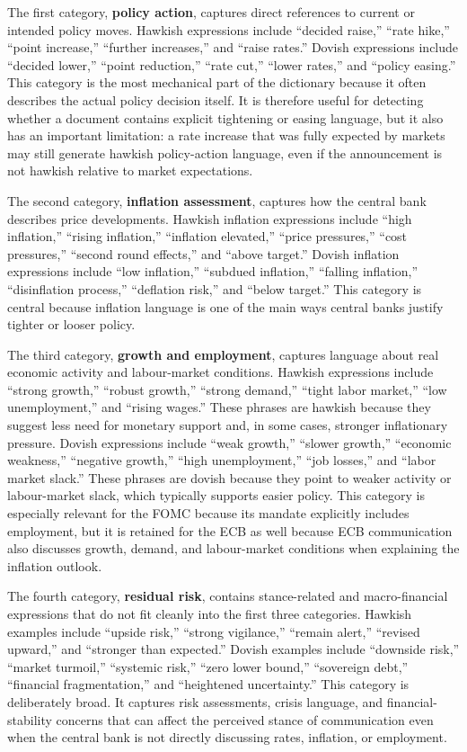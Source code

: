 The first category, \textbf{policy action}, captures direct
references to current or intended policy moves. Hawkish expressions
include ``decided raise,'' ``rate hike,'' ``point increase,''
``further increases,'' and ``raise rates.'' Dovish expressions
include ``decided lower,'' ``point reduction,'' ``rate cut,''
``lower rates,'' and ``policy easing.'' This category is the most
mechanical part of the dictionary because it often describes the
actual policy decision itself. It is therefore useful for detecting
whether a document contains explicit tightening or easing language,
but it also has an important limitation: a rate increase that was
fully expected by markets may still generate hawkish policy-action
language, even if the announcement is not hawkish relative to market
expectations.

The second category, \textbf{inflation assessment}, captures how
the central bank describes price developments. Hawkish inflation
expressions include ``high inflation,'' ``rising inflation,''
``inflation elevated,'' ``price pressures,'' ``cost pressures,''
``second round effects,'' and ``above target.'' Dovish inflation
expressions include ``low inflation,'' ``subdued inflation,''
``falling inflation,'' ``disinflation process,'' ``deflation risk,''
and ``below target.'' This category is central because inflation
language is one of the main ways central banks justify tighter or
looser policy.

The third category, \textbf{growth and employment}, captures
language about real economic activity and labour-market conditions.
Hawkish expressions include ``strong growth,'' ``robust growth,''
``strong demand,'' ``tight labor market,'' ``low unemployment,''
and ``rising wages.'' These phrases are hawkish because they suggest
less need for monetary support and, in some cases, stronger
inflationary pressure. Dovish expressions include ``weak growth,''
``slower growth,'' ``economic weakness,'' ``negative growth,''
``high unemployment,'' ``job losses,'' and ``labor market slack.''
These phrases are dovish because they point to weaker activity or
labour-market slack, which typically supports easier policy. This
category is especially relevant for the FOMC because its mandate
explicitly includes employment, but it is retained for the ECB as
well because ECB communication also discusses growth, demand, and
labour-market conditions when explaining the inflation outlook.

The fourth category, \textbf{residual risk}, contains stance-related
and macro-financial expressions that do not fit cleanly into the
first three categories. Hawkish examples include ``upside risk,''
``strong vigilance,'' ``remain alert,'' ``revised upward,'' and
``stronger than expected.'' Dovish examples include ``downside
risk,'' ``market turmoil,'' ``systemic risk,'' ``zero lower bound,''
``sovereign debt,'' ``financial fragmentation,'' and ``heightened
uncertainty.'' This category is deliberately broad. It captures
risk assessments, crisis language, and financial-stability concerns
that can affect the perceived stance of communication even when the
central bank is not directly discussing rates, inflation, or
employment.

